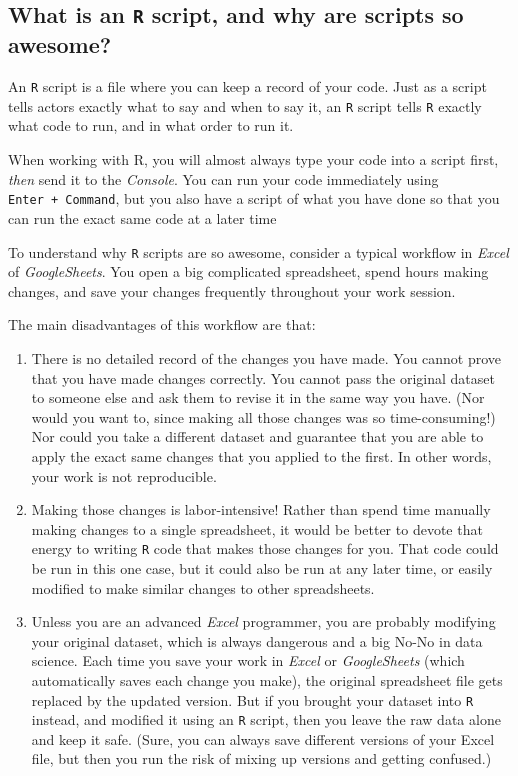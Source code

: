 \documentclass[
]{book}
\begin{document}
\hypertarget{what-is-an-r-script-and-why-are-scripts-so-awesome}{%
\subsection*{\texorpdfstring{What is an \texttt{R} script, and why are scripts so awesome?}{What is an R script, and why are scripts so awesome?}}\label{what-is-an-r-script-and-why-are-scripts-so-awesome}}

An \texttt{R} script is a file where you can keep a record of your code. Just as a script tells actors exactly what to say and when to say it, an \texttt{R} script tells \texttt{R} exactly what code to run, and in what order to run it.

When working with R, you will almost always type your code into a script first, \emph{then} send it to the \emph{Console}. You can run your code immediately using \texttt{Enter\ +\ Command}, but you also have a script of what you have done so that you can run the exact same code at a later time

To understand why \texttt{R} scripts are so awesome, consider a typical workflow in \emph{Excel} of \emph{GoogleSheets}. You open a big complicated spreadsheet, spend hours making changes, and save your changes frequently throughout your work session.

The main disadvantages of this workflow are that:

\begin{enumerate}
\def\labelenumi{\arabic{enumi}.}
\item
  There is no detailed record of the changes you have made. You cannot prove that you have made changes correctly. You cannot pass the original dataset to someone else and ask them to revise it in the same way you have. (Nor would you want to, since making all those changes was so time-consuming!) Nor could you take a different dataset and guarantee that you are able to apply the exact same changes that you applied to the first. In other words, your work is not reproducible.
\item
  Making those changes is labor-intensive! Rather than spend time manually making changes to a single spreadsheet, it would be better to devote that energy to writing \texttt{R} code that makes those changes for you. That code could be run in this one case, but it could also be run at any later time, or easily modified to make similar changes to other spreadsheets.
\item
  Unless you are an advanced \emph{Excel} programmer, you are probably modifying your original dataset, which is always dangerous and a big No-No in data science. Each time you save your work in \emph{Excel} or \emph{GoogleSheets} (which automatically saves each change you make), the original spreadsheet file gets replaced by the updated version. But if you brought your dataset into \texttt{R} instead, and modified it using an \texttt{R} script, then you leave the raw data alone and keep it safe. (Sure, you can always save different versions of your Excel file, but then you run the risk of mixing up versions and getting confused.)
\end{enumerate}
\end{document}
